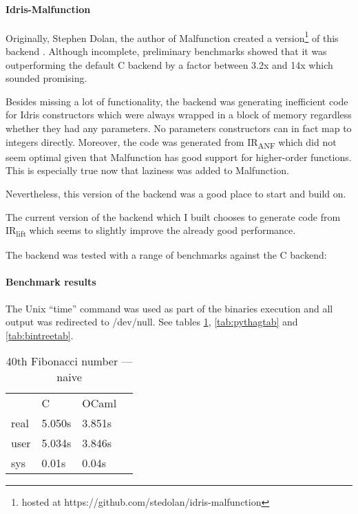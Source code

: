 \documentclass[a4paper,twocolumn]{article}
\begin{document}
\paragraph{Idris-Malfunction}

Originally, Stephen Dolan, the author of Malfunction created a
version\footnote{hosted at
    https://github.com/stedolan/idris-malfunction}
of this backend \cite{dolan2016malfunctional}.
Although incomplete, preliminary benchmarks showed that it was
outperforming the default C backend by a factor between 3.2x and 14x
which sounded promising.

Besides missing a lot of functionality, the backend was generating
inefficient code for Idris constructors which were always wrapped
in a block of memory regardless whether they had any parameters.
No parameters constructors can in fact map to integers directly.
Moreover, the code was generated from IR\textsubscript{ANF}
which did not seem optimal given that Malfunction has
good support for higher-order functions.
This is especially true now that laziness was added to Malfunction.

Nevertheless, this version of the backend was a good place to start
and build on.

The current version of the backend which I built chooses
to generate code from IR\textsubscript{lift} which seems to
slightly improve the already good performance.

The backend was tested with a range of benchmarks against the
C backend:

\paragraph{Benchmark results}
The Unix ``time'' command was used as part of the binaries execution
and all output was redirected to /dev/null.
See tables \ref{tab:fibtab},
\ref{tab:pythagtab} and
\ref{tab:bintreetab}.

\begin{table}
    \centering
    \caption{40th Fibonacci number --- naive}
    \begin{tabular}{llll}\label{tab:fibtab}
             & C      & OCaml  & \\
        real & 5.050s & 3.851s & \\
        user & 5.034s & 3.846s & \\
        sys  & 0.01s  & 0.04s  &
    \end{tabular}
\end{table}
\end{document}
